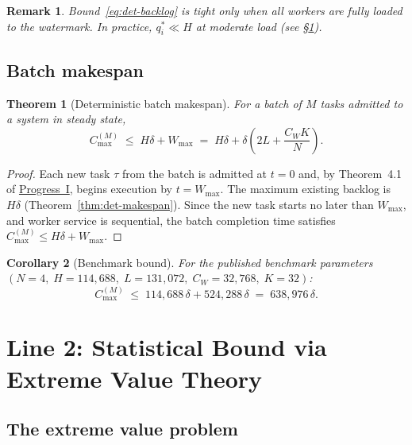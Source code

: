 \documentclass[11pt,a4paper]{report}
\newtheorem{theorem}{Theorem}[section]
\newtheorem{corollary}[theorem]{Corollary}
\newtheorem{remark}{Remark}[section]
\newcommand{\Wmax}{W_{\max}}
\newcommand{\Cmax}{C_{\max}}
\begin{document}
\begin{remark}
Bound~\eqref{eq:det-backlog} is tight only when all workers are fully
loaded to the watermark.  In practice, $q_i^* \ll H$ at moderate load
(see \S{}\ref{sec:stat}).
\end{remark}

\subsection{Batch makespan}

\begin{theorem}[Deterministic batch makespan]
\label{thm:det-batch}
For a batch of $M$ tasks admitted to a system in steady state,
\begin{equation}
  \Cmax^{(M)}
  \;\leq\;
  H\delta + \Wmax
  \;=\;
  H\delta + \delta\!\left(2L + \frac{C_W K}{N}\right).
  \label{eq:det-batch}
\end{equation}
\end{theorem}

\begin{proof}
Each new task $\tau$ from the batch is admitted at $t=0$ and, by
Theorem~4.1 of \hyperref[chap:bounded_wait]{Progress~I}, begins execution by
$t = \Wmax$.
The maximum existing backlog is $H\delta$ (Theorem~\ref{thm:det-makespan}).
Since the new task starts no later than $\Wmax$, and worker service is
sequential, the batch completion time satisfies
$\Cmax^{(M)} \leq H\delta + \Wmax$.
\end{proof}

\begin{corollary}[Benchmark bound]
\label{cor:det-benchmark}
For the published benchmark parameters
$(N=4,\; H=114{,}688,\; L=131{,}072,\; C_W=32{,}768,\; K=32)$:
\[
  \Cmax^{(M)} \;\leq\; 114{,}688\,\delta + 524{,}288\,\delta
  \;=\; 638{,}976\,\delta.
\]
\end{corollary}

\section{Line 2: Statistical Bound via Extreme Value Theory~\cite{leadbetter1983,fisher_tippett1928,gumbel1958}}
\label{sec:stat}

\subsection{The extreme value problem}
\end{document}
